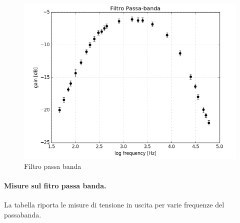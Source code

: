 \documentclass[10pt,a4paper]{article}
\begin{document}
\begin{figure}[h]
\centering
\includegraphics[scale=0.4]{immagine5.png}
\caption{Filtro passa banda}
\end{figure}

\paragraph{Misure sul fitro passa banda.}
La tabella riporta le misure di tensione in uscita per varie frequenze del passabanda.
\end{document}
